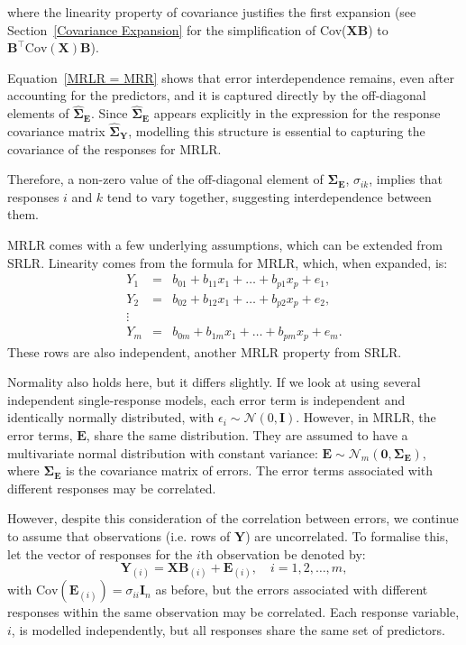 \documentclass[11pt]{report} %
\begin{document}
\noindent where the linearity property of covariance justifies the first expansion (see Section~\ref{Covariance Expansion} for the simplification of Cov(\( \mathbf{XB} \)) to \( \mathbf{B}^\top \text{Cov}(\mathbf{X}) \mathbf{B} \)).

Equation~\ref{MRLR = MRR} shows that error interdependence remains, even after accounting for the predictors, and it is captured directly by the off-diagonal elements of \(\hat{\boldsymbol{\Sigma}}_{\mathbf{E}}\). Since \(\hat{\boldsymbol{\Sigma}}_{\mathbf{E}}\) appears explicitly in the expression for the response covariance matrix \(\hat{\boldsymbol{\Sigma}}_{\mathbf{Y}}\), modelling this structure is essential to capturing the covariance of the responses for MRLR.

Therefore, a non-zero value of the off-diagonal element of $\mathbf{\Sigma_E}$, \( \sigma_{ik} \), implies that responses \( i \) and \( k \) tend to vary together, suggesting interdependence between them.

MRLR comes with a few underlying assumptions, which can be extended from SRLR. Linearity comes from the formula for MRLR, which, when expanded, is:
\[
\begin{array}{rcl}
    Y_1 & = & b_{01} + b_{11}x_1 + \dots + b_{p1}x_p + e_1, \\
    Y_2 & = & b_{02} + b_{12}x_1 + \dots + b_{p2}x_p + e_2, \\
    \vdots & & \\
    Y_m & = & b_{0m} + b_{1m}x_1 + \dots + b_{pm}x_p + e_m.
\end{array}
\]
These rows are also independent, another MRLR property from SRLR.

\noindent Normality also holds here, but it differs slightly. If we look at using several independent single-response models, each error term is independent and identically normally distributed, with $\epsilon_i \sim \mathcal{N}(0,\mathbf{I})$. However, in MRLR, the error terms, \( \mathbf{E} \), share the same distribution. They are assumed to have a multivariate normal distribution with constant variance: $\mathbf{E} \sim \mathcal{N}_m(\mathbf{0}, \mathbf{\Sigma_E})$, where \(\mathbf{\Sigma_E} \) is the covariance matrix of errors. The error terms associated with different responses may be correlated.\cite{johnson2013_chapter77}

However, despite this consideration of the correlation between errors, we continue to assume that observations (i.e. rows of \( \mathbf{Y} \)) are uncorrelated.\cite{johnson2013_chapter77}
To formalise this, let the vector of responses for the \( i \)th observation be denoted by:
\[
\mathbf{Y}_{(i)} = \mathbf{X}\mathbf{B}_{(i)} + \mathbf{E}_{(i)}, \quad i = 1, 2, \ldots, m,
\]
with $\text{Cov}(\mathbf{E}_{(i)}) = \sigma_{ii} \mathbf{I}_n$ as before, but the errors associated with different responses within the same observation may be correlated.\cite{johnson2013_chapter77} Each response variable, $i$, is modelled independently, but all responses share the same set of predictors.
\end{document}
